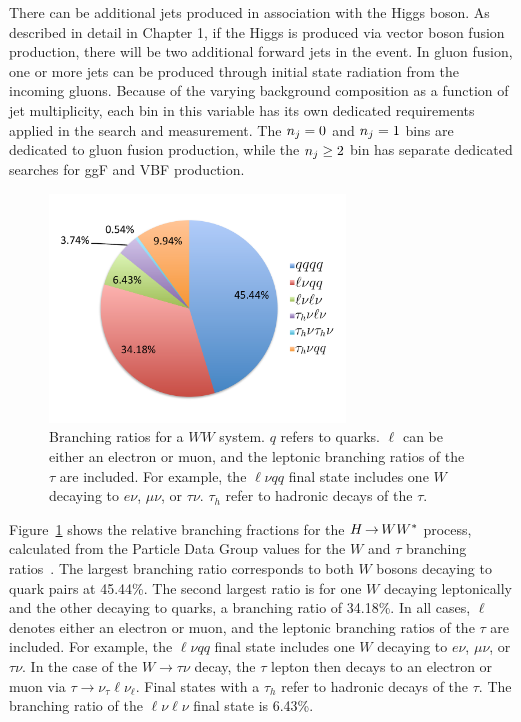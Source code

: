 There can be additional jets produced in association with the Higgs boson. As described in detail in Chapter 1, if the Higgs is produced via vector boson fusion production, there will be two additional forward jets in the event. In gluon fusion, one or more jets can be produced through initial state radiation from the incoming gluons. Because of the varying background composition as a function of jet multiplicity, each bin in this variable has its own dedicated requirements applied in the search and measurement. The $n_j = 0$ and $n_j = 1$ bins are dedicated to gluon fusion production, while the $n_j \geq 2$ bin has separate dedicated searches for ggF and VBF production. 

\begin{figure}[h!]
  \centering
  \captionsetup{justification=centering}
  \includegraphics[width=0.7\textwidth]{figures/WWBR}
  \caption{Branching ratios for a $WW$ system. $q$ refers to quarks. $\ell$ can be either an electron or muon, and the leptonic branching ratios of the $\tau$ are included. For example, the $\ell\nu qq$ final state includes one $W$ decaying to $e\nu$, $\mu \nu$, or $\tau \nu$. $\tau_h$ refer to hadronic decays of the $\tau$.}
  \label{fig:WWBR}
\end{figure}


Figure~\ref{fig:WWBR} shows the relative branching fractions for the $H{\,{\rightarrow}\,}WW^\ast$ process, calculated from the Particle Data Group values for the $W$ and $\tau$ branching ratios~\cite{PDG}. The largest branching ratio corresponds to both $W$ bosons decaying to quark pairs at 45.44\%. The second largest ratio is for one $W$ decaying leptonically and the other decaying to quarks, a branching ratio of 34.18\%. In all cases, $\ell$ denotes either an electron or muon, and the leptonic branching ratios of the $\tau$ are included. For example, the $\ell\nu qq$ final state includes one $W$ decaying to $e\nu$, $\mu \nu$, or $\tau \nu$. In the case of the $W\to\tau\nu$ decay, the $\tau$ lepton then decays to an electron or muon via $\tau \to \nu_\tau \ell \nu_\ell$. Final states with a $\tau_h$ refer to hadronic decays of the $\tau$. The branching ratio of the $\ell\nu\ell\nu$ final state is 6.43\%. 

